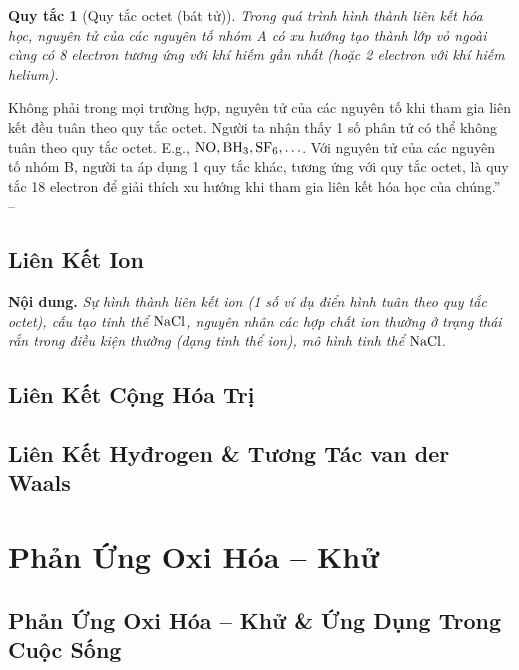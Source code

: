 \documentclass[oneside]{book}
\numberwithin{equation}{section}
\newtheorem{quytac}{Quy tắc}[section]
\begin{document}
\begin{quytac}[Quy tắc octet (bát tử)]
	Trong quá trình hình thành liên kết hóa học, nguyên tử của các nguyên tố nhóm A có xu hướng tạo thành lớp vỏ ngoài cùng có 8 electron tương ứng với khí hiếm gần nhất (hoặc 2 electron với khí hiếm helium).
\end{quytac}
Không phải trong mọi trường hợp, nguyên tử của các nguyên tố khi tham gia liên kết đều tuân theo quy tắc octet. Người ta nhận thấy 1 số phân tử có thể không tuân theo quy tắc octet. E.g., $\rm NO,BH_3,SF_6,\ldots$. Với nguyên tử của các nguyên tố nhóm B, người ta áp dụng 1 quy tắc khác, tương ứng với quy tắc octet, là quy tắc 18 electron để giải thích xu hướng khi tham gia liên kết hóa học của chúng.'' -- \cite[pp. 53--54]{SGK_Hoa_Hoc_10_Chan_Troi_Sang_Tao}


\section{Liên Kết Ion}
\textbf{Nội dung.} \textit{Sự hình thành liên kết ion (1 số ví dụ điển hình tuân theo quy tắc octet), cấu tạo tinh thể $\rm NaCl$, nguyên nhân các hợp chất ion thường ở trạng thái rắn trong điều kiện thường (dạng tinh thể ion), mô hình tinh thể $\rm NaCl$}.


\section{Liên Kết Cộng Hóa Trị}


\section{Liên Kết Hyđrogen \& Tương Tác van der Waals}


\chapter{Phản Ứng Oxi Hóa -- Khử}

\section{Phản Ứng Oxi Hóa -- Khử \& Ứng Dụng Trong Cuộc Sống}
\end{document}
